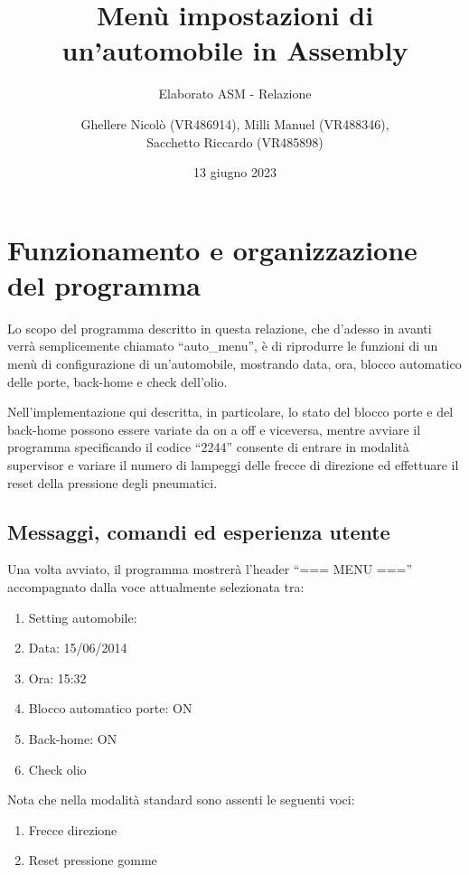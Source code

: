 \documentclass[
  12pt,
  a4paper,
  headings=optiontoheadandtoc
]{scrreprt}
\author{Ghellere Nicolò (VR486914), Milli Manuel (VR488346),\\Sacchetto Riccardo (VR485898)}
\date{13 giugno 2023}
\title{Menù impostazioni di un'automobile in Assembly}
\subtitle{Elaborato ASM - Relazione}
\begin{document}
\maketitle

\renewcommand*\contentsname{Indice}
\tableofcontents
\newpage

\chapter[nonumber=true]{Funzionamento e organizzazione del programma}

Lo scopo del programma descritto in questa relazione, che d'adesso in avanti verrà semplicemente chiamato ``auto\_menu'', è di riprodurre le funzioni di un menù di configurazione di un'automobile, mostrando data, ora, blocco automatico delle porte, back-home e check dell'olio.

Nell'implementazione qui descritta, in particolare, lo stato del blocco porte e del back-home possono essere variate da on a off e viceversa, mentre avviare il programma specificando il codice ``2244'' consente di entrare in modalità supervisor e variare il numero di lampeggi delle frecce di direzione ed effettuare il reset della pressione degli pneumatici.

\section[nonumber=true]{Messaggi, comandi ed esperienza utente}

Una volta avviato, il programma mostrerà l'header ``=== MENU ==='' accompagnato dalla voce attualmente selezionata tra:

\begin{enumerate}
\item Setting automobile:
\item Data: 15/06/2014
\item Ora: 15:32
\item Blocco automatico porte: ON
\item Back-home: ON
\item Check olio
\end{enumerate}

Nota che nella modalità standard sono assenti le seguenti voci:

\begin{enumerate}[start = 7]
\item Frecce direzione
\item Reset pressione gomme
\end{enumerate}
\end{document}
